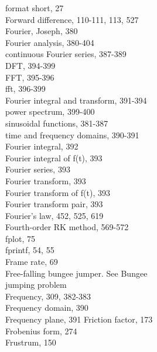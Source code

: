 \documentclass[../main.tex]{subfiles}
\begin{document}
\begin{multicols}{3}
    format short, 27\\
    Forward difference, 110-111, 113, 527\\
    Fourier, Joseph, 380\\
    Fourier analysis, 380-404\\
    \hspace*{3mm}continuous Fourier series, 387-389\\
    \hspace*{3mm}DFT, 394-399\\
    \hspace*{3mm}FFT, 395-396\\
    \hspace*{3mm}fft, 396-399\\
    \hspace*{3mm}Fourier integral and transform, 391-394\\
    \hspace*{3mm}power spectrum, 399-400\\
    \hspace*{3mm}sinusoidal functions, 381-387\\
    \hspace*{3mm}time and frequency domains, 390-391\\
    Fourier integral, 392\\
    Fourier integral of f(t), 393\\
    Fourier series, 393\\
    Fourier transform, 393\\
    Fourier transform of f(t), 393\\
    Fourier transform pair, 393\\
    Fourier's law, 452, 525, 619\\
    Fourth-order RK method, 569-572\\
    fplot, 75\\
    fprintf, 54, 55\\
    Frame rate, 69\\
    Free-falling bungee jumper. See Bungee\\
    \hspace*{3mm}jumping problem\\
    Frequency, 309, 382-383\\
    Frequency domain, 390\\
    Frequency plane, 391
    Friction factor, 173\\
    Frobenius form, 274\\
    Frustrum, 150\\

\end{multicols}
\end{document}
